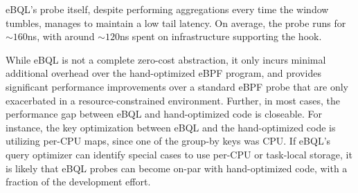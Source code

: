 eBQL's probe itself, despite performing aggregations every time the window tumbles, manages to
maintain a low tail latency. On average, the probe runs for $\sim 160$ns, with around $\sim 120$ns
spent on infrastructure supporting the hook.

While eBQL is not a complete zero-cost abstraction, it only incurs minimal additional overhead over
the hand-optimized eBPF program, and provides significant performance improvements over a standard
eBPF probe that are only exacerbated in a resource-constrained environment. Further, in most cases,
the performance gap between eBQL and hand-optimized code is closeable. For instance, the key
optimization between eBQL and the hand-optimized code is utilizing per-CPU maps, since one of the
group-by keys was CPU. If eBQL's query optimizer can identify special cases to use per-CPU or
task-local storage, it is likely that eBQL probes can become on-par with hand-optimized code, with a
fraction of the development effort.
